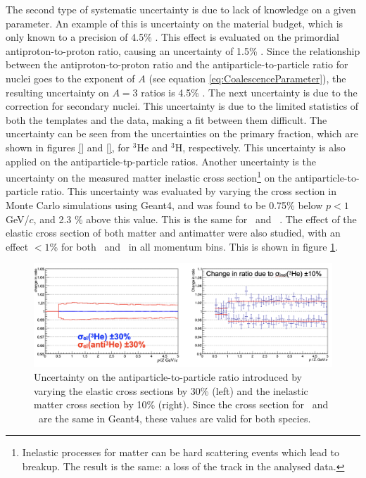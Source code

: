 The second type of systematic uncertainty is due to lack of knowledge on a given parameter. An example of this is uncertainty on the material budget, which is only known to a precision of 4.5\% . This effect is evaluated on the primordial antiproton-to-proton ratio, causing an uncertainty of 1.5\% . Since the relationship between the  antiproton-to-proton ratio and the antiparticle-to-particle ratio for nuclei goes to the exponent of $A$ (see equation \ref{eq:CoalescenceParameter}), the resulting uncertainty on $A=3$ ratios is 4.5\% . The next uncertainty is due to the correction for secondary nuclei. This uncertainty is due to the limited statistics of both the templates and the data, making a fit between them difficult. The uncertainty can be seen from the uncertainties on the primary fraction, which are shown in figures \ref{} and \ref{}, for $^3\mathrm{He}$ and $^3\mathrm{H}$, respectively. This uncertainty is also applied on the antiparticle-tp-particle ratios. Another uncertainty is the uncertainty on the measured matter inelastic cross section\footnote{Inelastic processes for matter can be hard scattering events which lead to breakup. The result is the same: a loss of the track in the analysed data.} on the antiparticle-to-particle ratio. This uncertainty was evaluated by varying the cross section in Monte Carlo simulations using Geant4, and was found to be 0.75\% below $p<1$ GeV/$c$, and 2.3 \% above this value. This is the same for \ahe\ and \atrit\, . The effect of the elastic cross section of both matter and antimatter were also studied, with an effect $< 1$\% for both \ahe\ and \atrit\ in all momentum bins. This is shown in figure \ref{fig:syst_uncertainties_elastic_xs}. \\

\begin{figure}
    \centering
    \includegraphics[width=\textwidth]{figures/systematic_uncertainty_other_xs.png}
    \caption{Uncertainty on the antiparticle-to-particle ratio introduced by varying the elastic cross sections by 30\% (left) and the inelastic matter cross section by 10\% (right). Since the cross section for \atrit\ and \ahe\ are the same in Geant4, these values are valid for both species.}
    \label{fig:syst_uncertainties_elastic_xs}
\end{figure}

